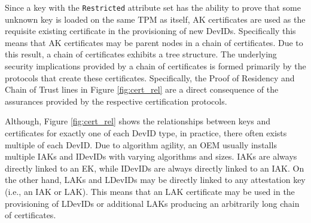 \documentclass[runningheads]{llncs}
\begin{document}
Since a key with the \verb|Restricted| attribute set has the ability to prove that some unknown key is loaded on the same TPM as itself, AK certificates are used as the requisite existing certificate in the provisioning of new DevIDs. Specifically this means that AK certificates may be parent nodes in a chain of certificates. Due to this result, a chain of certificates exhibits a tree structure. The underlying security implications provided by a chain of certificates is formed primarily by the protocols that create these certificates. Specifically, the Proof of Residency and Chain of Trust lines in Figure \ref{fig:cert_rel} are a direct consequence of the assurances provided by the respective certification protocols.

Although, Figure \ref{fig:cert_rel} shows the relationships between keys and certificates for exactly one of each DevID type, in practice, there often exists multiple of each DevID. Due to algorithm agility, an OEM usually installs multiple IAKs and IDevIDs with varying algorithms and sizes. IAKs are always directly linked to an EK, while IDevIDs are always directly linked to an IAK. On the other hand, LAKs and LDevIDs may be directly linked to any attestation key (i.e., an IAK or LAK). This means that an LAK certificate may be used in the provisioning of LDevIDs or additional LAKs producing an arbitrarily long chain of certificates. 
%
%
%
\end{document}

